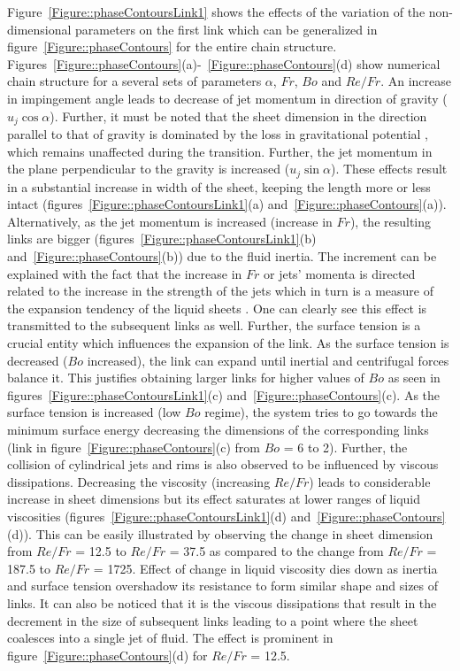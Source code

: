 Figure~\ref{Figure::phaseContoursLink1} shows the effects of the variation of the non-dimensional parameters on the first link which can be generalized in figure~\ref{Figure::phaseContours} for the entire chain structure. Figures~\ref{Figure::phaseContours}(a)-~\ref{Figure::phaseContours}(d) show numerical chain structure for a several sets of parameters $\alpha$, $Fr$, $Bo$ and $Re/Fr$. An increase in impingement angle leads to decrease of jet momentum in direction of gravity ($u_j\cos\alpha$). Further, it must be noted that the sheet dimension in the direction parallel to that of gravity is dominated by the loss in gravitational potential \citep{taylor1960formation}, which remains unaffected during the transition. Further, the jet momentum in the plane perpendicular to the gravity is increased ($u_j\sin\alpha$). These effects result in a substantial increase in width of the sheet, keeping the length more or less intact (figures~\ref{Figure::phaseContoursLink1}(a) and~\ref{Figure::phaseContours}(a)). Alternatively, as the jet momentum is increased (increase in $Fr$), the resulting links are bigger (figures~\ref{Figure::phaseContoursLink1}(b) and~\ref{Figure::phaseContours}(b)) due to the fluid inertia. The increment can be explained with the fact that the increase in $Fr$ or jets' momenta is directed related to the increase in the strength of the jets which in turn is a measure of the expansion tendency of the liquid sheets \citep{yang2014liquid}. One can clearly see this effect is transmitted to the subsequent links as well. Further, the surface tension is a crucial entity which influences the expansion of the link. As the surface tension is decreased ($Bo$ increased), the link can expand until inertial and centrifugal forces balance it. This justifies obtaining larger links for higher values of $Bo$ as seen in figures~\ref{Figure::phaseContoursLink1}(c) and~\ref{Figure::phaseContours}(c). As the surface tension is increased (low $Bo$ regime), the system tries to go towards the minimum surface energy decreasing the dimensions of the corresponding links (link in figure~\ref{Figure::phaseContours}(c) from $Bo$ = 6 to 2). Further, the collision of cylindrical jets and rims is also observed to be influenced by viscous dissipations. Decreasing the viscosity (increasing $Re/Fr$) leads to considerable increase in sheet dimensions but its effect saturates at lower ranges of liquid viscosities (figures~\ref{Figure::phaseContoursLink1}(d) and~\ref{Figure::phaseContours}(d)). This can be easily illustrated by observing the change in sheet dimension from $Re/Fr$ = 12.5 to $Re/Fr$ = 37.5 as compared to the change from $Re/Fr$ = 187.5 to $Re/Fr$ = 1725. Effect of change in liquid viscosity dies down as inertia and surface tension overshadow its resistance to form similar shape and sizes of links. It can also be noticed that it is the viscous dissipations that result in the decrement in the size of subsequent links leading to a point where the sheet coalesces into a single jet of fluid. The effect is prominent in figure~\ref{Figure::phaseContours}(d) for $Re/Fr$ = 12.5.\\
